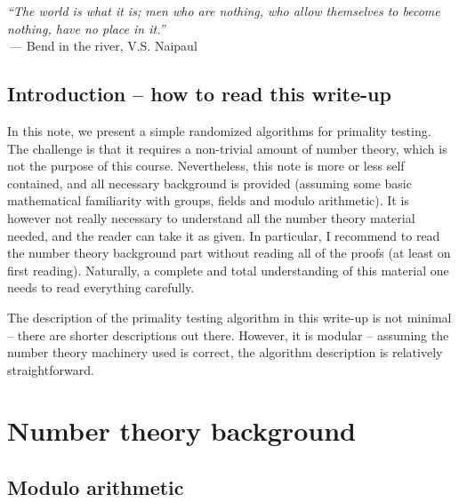 \makeatletter
{}
\makeatother
\ifx\bookMode\undefined%
\fi
{}

\ChapterPrefix{}
\ChapterGen{}


{
\begin{minipage}{0.9\linewidth}
    \textsl{``The world is what it is; men who are nothing, who allow
       themselves to become nothing, have no place in it.''
    }\\
    $~$\qquad\qquad--- Bend in the river, V.S. Naipaul
\end{minipage}}


\subsection*{Introduction -- how to read this write-up}


In this note, we present a simple randomized algorithms for primality
testing.  The challenge is that it requires a non-trivial amount of
number theory, which is not the purpose of this course. Nevertheless,
this note is more or less self contained, and all necessary background
is provided (assuming some basic mathematical familiarity with groups,
fields and modulo arithmetic). It is however not really necessary to
understand all the number theory material needed, and the reader can
take it as given. In particular, I recommend to read the number theory
background part without reading all of the proofs (at least on first
reading). Naturally, a complete and total understanding of this
material one needs to read everything carefully.

The description of the primality testing algorithm in this write-up is
not minimal -- there are shorter descriptions out there. However, it
is modular -- assuming the number theory machinery used is correct,
the algorithm description is relatively straightforward.



\section{Number theory background}


\subsection{Modulo arithmetic}

